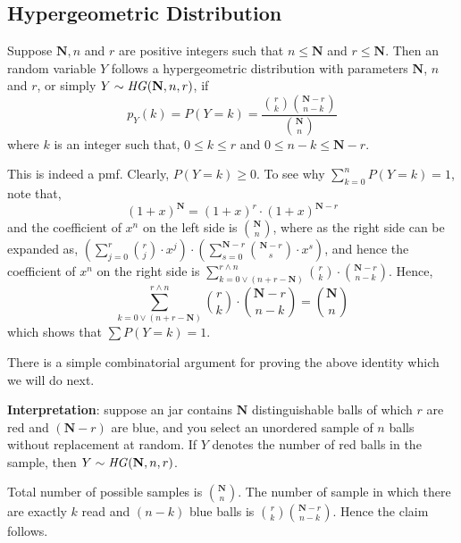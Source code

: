 \subsection{Hypergeometric Distribution}
\begin{definition}
    Suppose $\mathbf{N}, n$ and $r$  are positive integers such that $n \leq
\mathbf{N}$ and $r \leq \mathbf{N}$. Then an random variable $Y$ follows a
hypergeometric distribution with parameters $\mathbf{N}$, $n$ and $r$, or
simply $Y \sim \text{\emph{HG}}(\mathbf{N}, n, r)$, if
\[ p_Y(k) = 
   P(Y = k) = \frac{{r \choose k} {{\mathbf{N} - r} \choose {n - k}}}       
              {{\mathbf{N} \choose n}}                                       \]
where $k$ is an integer such that, $0 \leq k \leq r$ and $0 \leq n - k \leq
\mathbf{N} - r$.
\end{definition}

\noindent
This is indeed a pmf. Clearly, $P(Y = k) \geq 0$. To see why $\sum_{k = 0}^n
P(Y = k) = 1$, note that, 
\[ (1 + x)^\mathbf{N} = (1 + x)^r \cdot (1 + x)^{\mathbf{N} - r}             \]
and the coefficient of $x^n$ on the left side is ${\mathbf{N} \choose n}$,
where as the right side can be expanded as, $(\sum_{j = 0}^r {r \choose j}
\cdot x^j) \cdot (\sum_{s = 0}^{\mathbf{N} - r} {{\mathbf{N} - r} \choose s}
\cdot x^s)$, and hence the coefficient of $x^n$ on the right side is 
$\sum_{k = 0 \lor (n + r - \mathbf{N})}^{r \land n} {r \choose k} \cdot
{{\mathbf{N} - r} \choose {n - k}}$. Hence, 
\[ 
    \sum_{k = 0 \lor (n + r - \mathbf{N})}^{r \land n} 
        {r \choose k} \cdot
        {{\mathbf{N} - r} \choose {n - k}}
    =
    {{\mathbf{N}} \choose n}
\]
which shows that $\sum P(Y = k) = 1$.

\note There is a simple combinatorial argument for proving the above identity
which we will do next.

\noindent
\textbf{Interpretation}: suppose an jar contains $\mathbf{N}$ distinguishable
balls of which $r$ are red and $(\mathbf{N} - r)$ are blue, and you select an
unordered sample of $n$ balls without replacement at random. If $Y$ denotes the
number of red balls in the sample, then $Y \sim
\text{\emph{HG}}(\mathbf{N}, n, r)$.

Total number of possible samples is $\mathbf{N} \choose n$. The number of
sample in which there are exactly $k$ read and $(n - k)$ blue balls is ${r
\choose k} {{\mathbf{N} - r} \choose {n - k}}$. Hence the claim follows.

